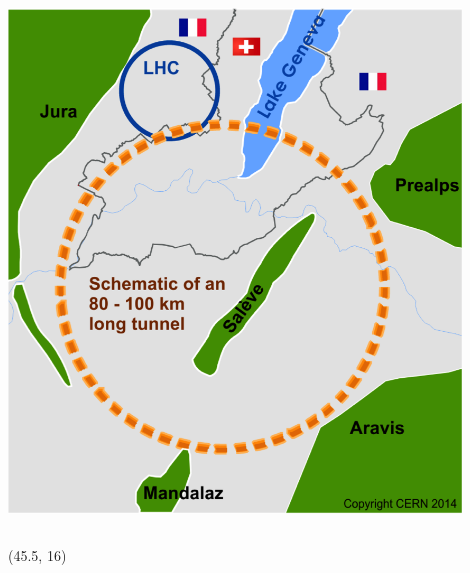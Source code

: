 \documentclass[final,xcolor={dvipsnames,svgnames,x11names,table}]{beamer}
\begin{document}
\begin{frame}
\begin{textblock}{44.5}
\begin{tcolorbox}[title=The Future Circular Collider Experiment (FCC)]
\begin{columns}
      \centering
      \includegraphics[width=0.9\textwidth]{Figures/cernFCC}
  \end{columns}

  \end{tcolorbox}
\end{textblock}

\begin{textblock}{38}(45.5, 16)
  \begin{tcolorbox}[title=FCCSW: simulation software for FCC]


\end{tcolorbox}
\end{textblock}
\end{frame}
\end{document}
